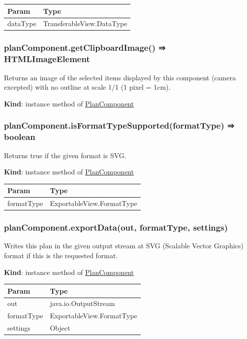 \documentclass[a4paper]{report}
\begin{document}
\begin{longtable}[]{@{}ll@{}}
\toprule
Param & Type\tabularnewline
\midrule
\endhead
dataType & TransferableView.DataType\tabularnewline
\bottomrule
\end{longtable}

\hypertarget{plancomponent.getclipboardimage-htmlimageelement}{%
\subsubsection{planComponent.getClipboardImage() ⇒
HTMLImageElement}\label{plancomponent.getclipboardimage-htmlimageelement}}

Returns an image of the selected items displayed by this component
(camera excepted) with no outline at scale 1/1 (1 pixel = 1cm).

\textbf{Kind}: instance method of
\protect\hyperlink{PlanComponent}{PlanComponent}\\

\hypertarget{plancomponent.isformattypesupportedformattype-boolean}{%
\subsubsection{planComponent.isFormatTypeSupported(formatType) ⇒
boolean}\label{plancomponent.isformattypesupportedformattype-boolean}}

Returns true if the given format is SVG.

\textbf{Kind}: instance method of
\protect\hyperlink{PlanComponent}{PlanComponent}

\begin{longtable}[]{@{}ll@{}}
\toprule
Param & Type\tabularnewline
\midrule
\endhead
formatType & ExportableView.FormatType\tabularnewline
\bottomrule
\end{longtable}

\hypertarget{plancomponent.exportdataout-formattype-settings}{%
\subsubsection{planComponent.exportData(out, formatType,
settings)}\label{plancomponent.exportdataout-formattype-settings}}

Writes this plan in the given output stream at SVG (Scalable Vector
Graphics) format if this is the requested format.

\textbf{Kind}: instance method of
\protect\hyperlink{PlanComponent}{PlanComponent}

\begin{longtable}[]{@{}ll@{}}
\toprule
Param & Type\tabularnewline
\midrule
\endhead
out & java.io.OutputStream\tabularnewline
formatType & ExportableView.FormatType\tabularnewline
settings & Object\tabularnewline
\bottomrule
\end{longtable}
\end{document}
